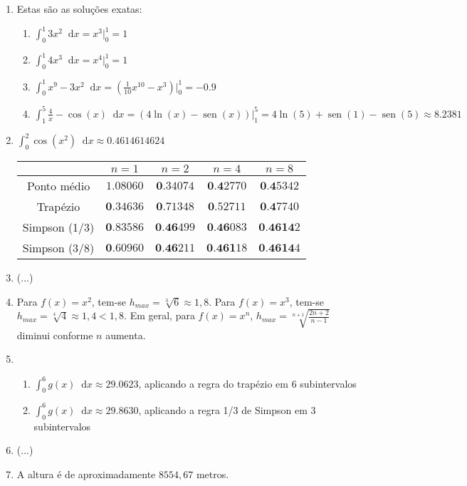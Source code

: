 \documentclass[12pt,a4paper]{article}
\newcommand{\fixme}{{\color{red}(...)}}
\newcommand*\sen{\operatorname{sen}}
\newcommand*\diff{\mathop{}\!\mathrm{d}}
\begin{document}
\begin{enumerate}
\item Estas são as soluções exatas:
\begin{enumerate}
\item $\int_0^1 3x^2 \diff{x} = x^3 \Big|_0^1 = 1$
\item $\int_0^1 4x^3 \diff{x} = x^4 \Big|_0^1 = 1$
\item $\int_0^1 x^9 - 3x^2 \diff{x}= \left(\frac{1}{10}x^{10} - x^3\right) \Big|_0^1 = -0.9$
\item $\int_1^5 \frac{4}{x} - \cos(x) \diff{x} = \left( 4\ln(x) - \sen(x)\right) \Big|_1^5 = 4\ln(5) + \sen(1) - \sen(5) \approx 8.2381$
\end{enumerate}
\item $\int_0^2 \cos(x^2)\diff{x} \approx 0.4614614624$
\begin{center}
\begin{tabular}{|c|c|c|c|c|}
\hline
              & $n=1$     & $n=2$    & $n=4$   & $n=8$ \\ \hline
Ponto médio   & $1.08060$ & $\textbf{0}.34074$ & $\textbf{0.4}2770$ & $\textbf{0.4}5342$ \\ \hline
Trapézio      & $\textbf{0}.34636$ & $\textbf{0}.71348$ & $\textbf{0}.52711$ & $\textbf{0.4}7740$ \\ \hline
Simpson (1/3) & $\textbf{0}.83586$ & $\textbf{0.46}499$ & $\textbf{0.46}083$ & $\textbf{0.4614}2$ \\ \hline
Simpson (3/8) & $\textbf{0}.60960$ & $\textbf{0.46}211$ & $\textbf{0.461}18$ & $\textbf{0.4614}4$ \\ \hline
\end{tabular}
\end{center}
\item \fixme
\item Para $f(x) = x^2$, tem-se $h_{max}=\sqrt[3]{6} \approx 1,8$. Para $f(x) = x^3$, tem-se $h_{max}=\sqrt[4]{4}\approx 1,4 < 1,8$. Em geral, para $f(x) = x^n$, $h_{max}=\sqrt[n+1]{\frac{2n+2}{n-1}}$ diminui conforme $n$ aumenta.
\item
\begin{enumerate}
\item $\int_0^6 g(x)\diff{x} \approx 29.0623$, aplicando a regra do trapézio em $6$ subintervalos
\item $\int_0^6 g(x)\diff{x} \approx 29.8630$, aplicando a regra 1/3 de Simpson em $3$ subintervalos
\end{enumerate}
\item \fixme
\item A altura é de aproximadamente $8554,67$ metros.

\end{enumerate}
\end{document}
